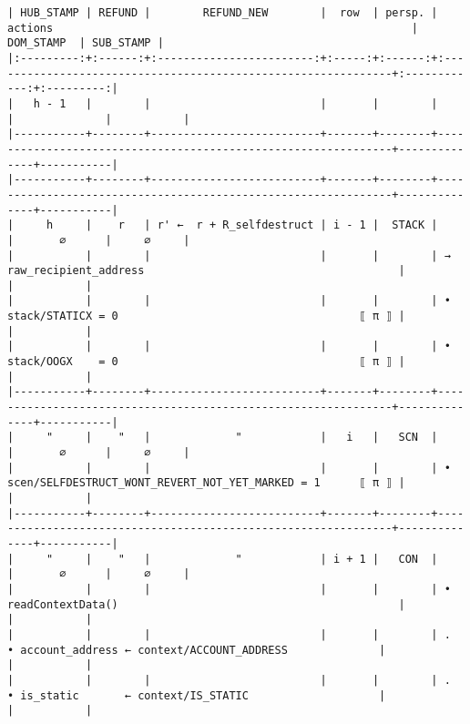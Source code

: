 \documentclass[varwidth=\maxdimen,margin=0.5cm,multi={verbatim}]{standalone}
\begin{document}
\begin{verbatim}
| HUB_STAMP | REFUND |        REFUND_NEW        |  row  | persp. | actions                                                       |   DOM_STAMP  | SUB_STAMP |
|:---------:+:------:+:------------------------:+:-----:+:------:+:--------------------------------------------------------------+:------------:+:---------:|
|   h - 1   |        |                          |       |        |                                                               |              |           |
|-----------+--------+--------------------------+-------+--------+---------------------------------------------------------------+--------------+-----------|
|-----------+--------+--------------------------+-------+--------+---------------------------------------------------------------+--------------+-----------|
|     h     |    r   | r' ←  r + R_selfdestruct | i - 1 |  STACK |                                                               |       ∅      |     ∅     |
|           |        |                          |       |        | → raw_recipient_address                                       |              |           |
|           |        |                          |       |        | • stack/STATICX = 0                                     ⟦ π ⟧ |              |           |
|           |        |                          |       |        | • stack/OOGX    = 0                                     ⟦ π ⟧ |              |           |
|-----------+--------+--------------------------+-------+--------+---------------------------------------------------------------+--------------+-----------|
|     "     |    "   |             "            |   i   |   SCN  |                                                               |       ∅      |     ∅     |
|           |        |                          |       |        | • scen/SELFDESTRUCT_WONT_REVERT_NOT_YET_MARKED = 1      ⟦ π ⟧ |              |           |
|-----------+--------+--------------------------+-------+--------+---------------------------------------------------------------+--------------+-----------|
|     "     |    "   |             "            | i + 1 |   CON  |                                                               |       ∅      |     ∅     |
|           |        |                          |       |        | • readContextData()                                           |              |           |
|           |        |                          |       |        | .    • account_address ← context/ACCOUNT_ADDRESS              |              |           |
|           |        |                          |       |        | .    • is_static       ← context/IS_STATIC                    |              |           |

\end{verbatim}
\end{document}
